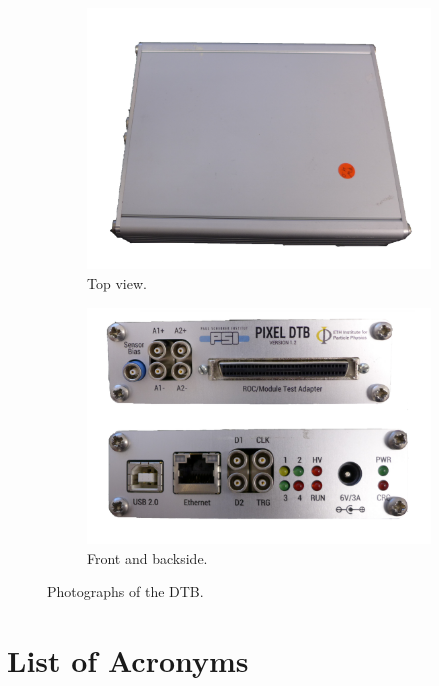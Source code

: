 \documentclass[british,11pt,a4paper]{memoir}
\begin{document}
\begin{figure}[ht]
	\centering
	\begin{subfigure}[b]{0.47\textwidth}
        \includegraphics[width=\textwidth]{DTB}
		\caption{Top view.}
		\label{p10}
	\end{subfigure}
	\hfill
	\begin{subfigure}[b]{0.47\textwidth}
		\includegraphics[width=\textwidth]{DTB-Sides}
		\caption{Front and backside.}
		\label{p11}
	\end{subfigure}
	\caption{Photographs of the \ac{DTB}.}
	\label{pdtb}
\end{figure}
\chapter*{List of Acronyms}



\end{document}

